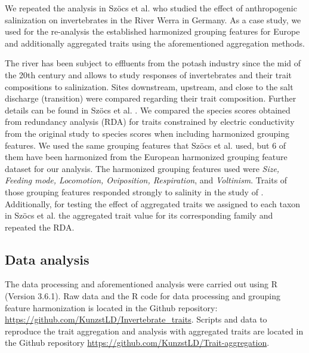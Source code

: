 \documentclass{article}
\begin{document}
We repeated the analysis in Szöcs et al. \cite{szocs_effects_2014} who studied the effect of anthropogenic salinization on invertebrates in the River Werra in Germany. As a case study, we used for the re-analysis the established harmonized grouping features for Europe and additionally aggregated traits using the aforementioned aggregation methods. 

The river has been subject to effluents from the potash industry since the mid of the 20th century and allows to study responses of invertebrates and their trait compositions to salinization. Sites downstream, upstream, and close to the salt discharge (transition) were compared regarding their trait composition. Further details can be found in Szöcs et al. \cite{szocs_effects_2014}. We compared the species scores obtained from redundancy analysis (RDA) for traits constrained by electric conductivity from the original study to species scores when including harmonized grouping features. We used the same grouping features that Szöcs et al. \cite{szocs_effects_2014} used, but 6 of them have been harmonized from the European harmonized grouping feature dataset for our analysis. The harmonized grouping features used were \textit{Size, Feeding mode, Locomotion, Oviposition, Respiration}, and \textit{Voltinism}. Traits of those grouping features responded strongly to salinity in the study of \cite{szocs_effects_2014}. Additionally, for testing the effect of aggregated traits we assigned to each taxon in Szöcs et al. \cite{szocs_effects_2014} the aggregated trait value for its corresponding family and repeated the RDA. 


\subsection*{Data analysis}

The data processing and aforementioned analysis were carried out using R (Version 3.6.1). Raw data and the R code for data processing and grouping feature harmonization is located in the Github repository: \url{https://github.com/KunzstLD/Invertebrate_traits}. Scripts and data to reproduce the trait aggregation and analysis with aggregated traits are located in the Github repository \url{https://github.com/KunzstLD/Trait-aggregation}.

\end{document}
